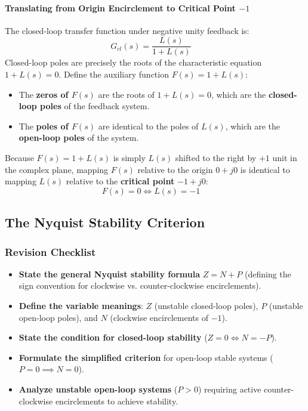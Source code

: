 \documentclass[12pt,onecolumn,twoside ]{article}
\begin{document}
	\paragraph{Translating from Origin Encirclement to Critical Point $-1$}
	The closed-loop transfer function under negative unity feedback is: \[
	G_{cl}(s) = \frac{L(s)}{1 + L(s)} \quad
	\] Closed-loop poles are precisely the roots of the characteristic equation $1 + L(s) = 0$. Define the auxiliary function $F(s) = 1 + L(s)$:
	\begin{itemize}
		\item
		The \textbf{zeros of $F(s)$} are the roots of $1 + L(s) = 0$, which are the \textbf{closed-loop poles} of the feedback system.
		\item
		The \textbf{poles of $F(s)$} are identical to the poles of $L(s)$, which are the \textbf{open-loop poles} of the system.
	\end{itemize}
	Because $F(s) = 1 + L(s)$ is simply $L(s)$ shifted to the right by $+1$ unit in the complex plane, mapping $F(s)$ relative to the origin $0 + j0$ is identical to mapping $L(s)$ relative to the \textbf{critical point} $-1 + j0$: \[
	F(s) = 0 \iff L(s) = -1 \quad
	\]
	
	\subsection{The Nyquist Stability Criterion}
	\subsubsection{Revision Checklist}
	\begin{itemize}
		\item[$\square$]
		\textbf{State the general Nyquist stability formula} $Z = N + P$ (defining the sign convention for clockwise vs. counter-clockwise encirclements).
		\item[$\square$]
		\textbf{Define the variable meanings}: $Z$ (unstable closed-loop poles), $P$ (unstable open-loop poles), and $N$ (clockwise encirclements of $-1$).
		\item[$\square$]
		\textbf{State the condition for closed-loop stability} ($Z = 0 \iff N = -P$).
		\item[$\square$]
		\textbf{Formulate the simplified criterion} for open-loop stable systems ($P = 0 \implies N = 0$).
		\item[$\square$]
		\textbf{Analyze unstable open-loop systems} ($P > 0$) requiring active counter-clockwise encirclements to achieve stability.
	\end{itemize}
	
\end{document}
